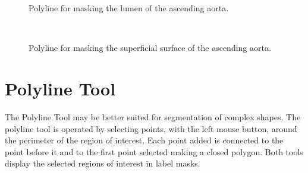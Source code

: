 \documentclass[fleqn,11pt,openany]{book}
\begin{document}


\begin{figure}
\caption{Polyline for masking the lumen of the ascending aorta.}\label{fig:polylinelumen}
\end{figure}

\begin{figure}
\\
\caption{Polyline for masking the superficial surface of the ascending aorta.}
\label{fig:polylinesuperficial}
\end{figure}

\section{Polyline Tool} 

The Polyline Tool may be better suited for segmentation of complex shapes.  The polyline tool is operated by selecting points, with the left mouse button, around the perimeter of the region of interest.  Each point added is connected to the point before it and to the first point selected making a closed polygon.  Both tools display the selected regions of interest in label masks.
\end{document}
